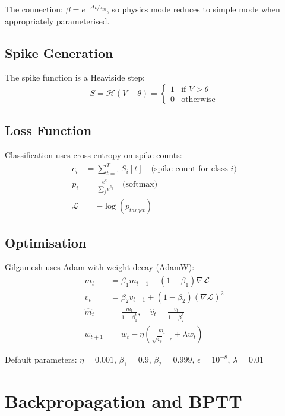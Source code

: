 \documentclass[11pt,a4paper]{article}
\begin{document}
The connection: $\beta = e^{-\Delta t/\tau_m}$, so physics mode reduces to simple mode when appropriately parameterised.

\subsection{Spike Generation}

The spike function is a Heaviside step:
\begin{equation}
    S = \mathcal{H}(V - \theta) = \begin{cases} 1 & \text{if } V > \theta \\ 0 & \text{otherwise} \end{cases}
\end{equation}

\subsection{Loss Function}

Classification uses cross-entropy on spike counts:
\begin{align}
    c_i &= \sum_{t=1}^{T} S_i[t] \quad \text{(spike count for class } i\text{)} \\
    p_i &= \frac{e^{c_i}}{\sum_j e^{c_j}} \quad \text{(softmax)} \\
    \mathcal{L} &= -\log(p_{target})
\end{align}

\subsection{Optimisation}

Gilgamesh uses Adam with weight decay (AdamW):
\begin{align}
    m_t &= \beta_1 m_{t-1} + (1-\beta_1) \nabla \mathcal{L} \\
    v_t &= \beta_2 v_{t-1} + (1-\beta_2) (\nabla \mathcal{L})^2 \\
    \hat{m}_t &= \frac{m_t}{1-\beta_1^t}, \quad \hat{v}_t = \frac{v_t}{1-\beta_2^t} \\
    w_{t+1} &= w_t - \eta \left( \frac{\hat{m}_t}{\sqrt{\hat{v}_t} + \epsilon} + \lambda w_t \right)
\end{align}

Default parameters: $\eta = 0.001$, $\beta_1 = 0.9$, $\beta_2 = 0.999$, $\epsilon = 10^{-8}$, $\lambda = 0.01$

\section{Backpropagation and BPTT}
\end{document}
